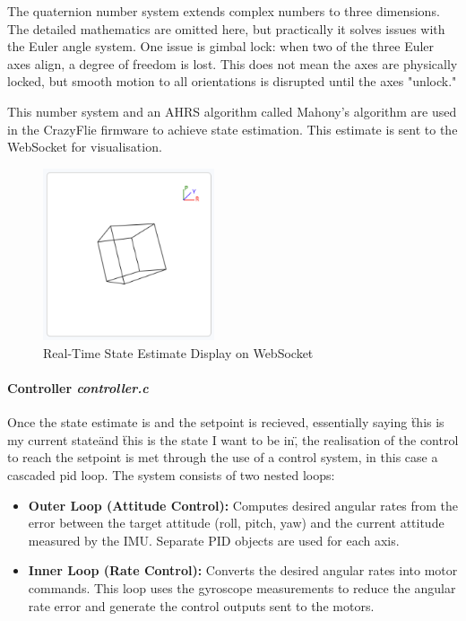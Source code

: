 The quaternion number system extends complex numbers to three dimensions. The detailed mathematics are omitted here, but practically it solves issues with the Euler angle system. One issue is gimbal lock: when two of the three Euler axes align, a degree of freedom is lost. This does not mean the axes are physically locked, but smooth motion to all orientations is disrupted until the axes "unlock."

This number system and an AHRS algorithm called Mahony's algorithm are used in the CrazyFlie firmware to achieve state estimation. This estimate is sent to the WebSocket for visualisation.

\begin{figure}[H]
    \centering
    \captionsetup{justification=centering, margin=1cm}
    \includegraphics[width=0.45\textwidth]{img/websocket-state.PNG}
    \caption{Real-Time State Estimate Display on WebSocket}
    \label{fig:ws-state}
\end{figure}

\paragraph{\textbf{Controller} \textit{controller.c}} \leavevmode 

Once the state estimate is and the setpoint is recieved, essentially saying \"this is my current state\" and \"this is the state I want to be in\", the realisation of the control to reach the setpoint is met through the use of a control system, in this case a cascaded \gls{pid} loop. The system consists of two nested loops:

\begin{itemize}
    \item \textbf{Outer Loop (Attitude Control):} Computes desired angular rates from the error between the target attitude (roll, pitch, yaw) and the current attitude measured by the IMU. Separate PID objects are used for each axis.
    \item \textbf{Inner Loop (Rate Control):} Converts the desired angular rates into motor commands. This loop uses the gyroscope measurements to reduce the angular rate error and generate the control outputs sent to the motors.
\end{itemize}

